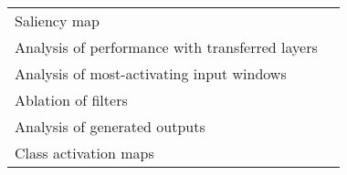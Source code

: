 \begin{tabular}{ll}
Saliency map                                           &                                                                                                                                                                               \cite{Vilamala2017} \\
Analysis of performance with transferred layers        &                                                                                                                                                                            \cite{Hajinoroozi2017} \\
Analysis of most-activating input windows              &                                                                                                                                                                              \cite{Hartmann2018b} \\
Ablation of filters                                    &                                                                                                                                                                                \cite{Lawhern2018} \\
Analysis of generated outputs                          &                                                                                                                                                                               \cite{Hartmann2018} \\
Class activation maps                                  &                                                                                                                                                                                  \cite{Ghosh2018} \\
\bottomrule
\end{tabular}
